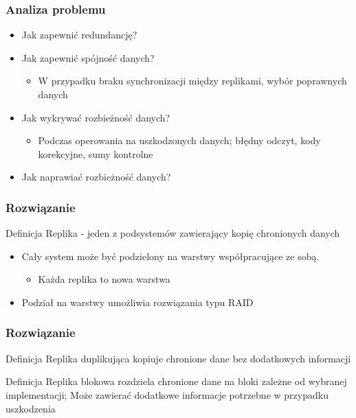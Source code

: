 \documentclass{beamer}
\begin{document}
	\begin{frame}
		\frametitle{Analiza problemu}

		\begin{itemize}
			\item Jak zapewnić redundancję?
			\pause
			\item Jak zapewnić spójność danych?
			\begin{itemize}
				\item W przypadku braku synchronizacji między replikami, wybór poprawnych danych
			\end{itemize}
			\pause
			\item Jak wykrywać rozbieżność danych?
			\begin{itemize}
				\item Podczas operowania na uszkodzonych danych; błędny odczyt, kody korekcyjne, sumy kontrolne 
			\end{itemize}
			\pause
			\item Jak naprawiać rozbieżność danych?
			
		\end{itemize}
	\end{frame}
		
	\begin{frame}
		\frametitle{Rozwiązanie}
			\begin{block}{Definicja}
				Replika - jeden z podsystemów zawierający kopię chronionych danych
			\end{block}
			\pause
			\begin{itemize}
				\item Cały system może być podzielony na warstwy współpracujące ze sobą. 
				\begin{itemize}
					\item Każda replika to nowa warstwa
				\end{itemize}
				\pause
				\item Podział na warstwy umożliwia rozwiązania typu RAID
			\end{itemize}
			
	\end{frame}

		
\begin{frame}
	\frametitle{Rozwiązanie}
	\begin{block}{Definicja}
		Replika duplikująca kopiuje chronione dane bez dodatkowych informacji
	\end{block}
	\pause
	\begin{block}{Definicja}
		Replika blokowa rozdziela chronione dane na bloki zależne od wybranej implementacji; Może zawierać dodatkowe informacje potrzebne w przypadku uszkodzenia
	\end{block}
\end{frame}
\end{document}
